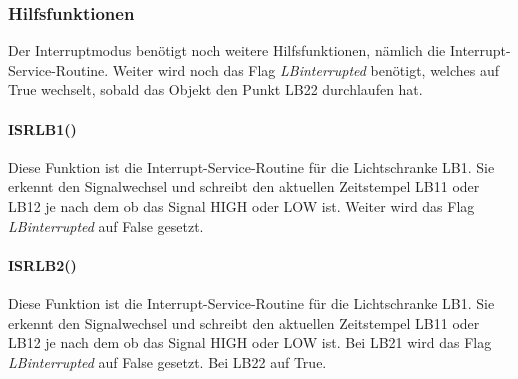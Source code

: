 \subsubsection{Hilfsfunktionen}
Der Interruptmodus benötigt noch weitere Hilfsfunktionen, nämlich die Interrupt-Service-Routine. Weiter wird noch das Flag  \textit{LBinterrupted} benötigt, welches auf True wechselt, sobald das Objekt den Punkt LB22 durchlaufen hat.

\paragraph{ISRLB1()}
Diese Funktion ist die Interrupt-Service-Routine für die Lichtschranke LB1. Sie erkennt den Signalwechsel und schreibt den aktuellen Zeitstempel LB11 oder LB12 je nach dem ob das Signal HIGH oder LOW ist. Weiter wird das Flag \textit{LBinterrupted} auf False gesetzt.\\


\paragraph{ISRLB2()}
Diese Funktion ist die Interrupt-Service-Routine für die Lichtschranke LB1. Sie erkennt den Signalwechsel und schreibt den aktuellen Zeitstempel LB11 oder LB12 je nach dem ob das Signal HIGH oder LOW ist. Bei LB21 wird das Flag \textit{LBinterrupted} auf False gesetzt. Bei LB22 auf True.\\

%
%
%
%





